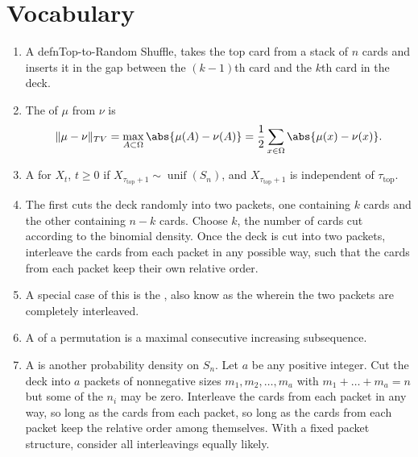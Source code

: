 \documentclass[12pt]{article}
\begin{document}
\section*{Vocabulary}
\begin{enumerate}
    \item
        A defn{Top-to-Random Shuffle},%
        takes the top card from a stack of \( n \) cards and inserts it
        in the gap between the \( (k-1) \)th card and the \( k \)th card
        in the deck.
    \item
        The  of \( \mu \) from \( \nu \)
        is%
        \[
            \| \mu - \nu \|_{TV} = \max_{A \subset \Omega} \abs{ \mu(A)
            - \nu(A)} = \frac{1}{2} \sum\limits_{x \in \Omega} \abs{ \mu
            (x) - \nu(x)}.
        \]
    \item
        A %
        for \( X_t \), \( t \ge 0 \) if \( X_{\tau_{\text{top}}+1} \sim
        \operatorname{unif}
        (S_n) \), and \( X_{\tau_{\text{top}}+1} \) is independent of \(
        \tau_{\text{top}} \).
    \item
        The  first cuts the deck randomly into two
        packets, one containing \( k \) cards and the other containing \(
        n-k \) cards.  Choose \( k \), the number of cards cut according
        to the binomial density. Once the deck is cut into two packets,
        interleave the cards from each packet in any possible way, such
        that the cards from each packet keep their own relative order.
    \item
        A special case of this is the , also know
        as the  wherein the two packets are
        completely interleaved.
    \item
        A  of a permutation is a maximal
        consecutive increasing subsequence.
    \item
        A  is another probability density on \( S_n
        \).  Let \( a \) be any positive integer.  Cut the deck into \(
        a \) packets of nonnegative sizes \( m_1, m_2, \dots, m_a \)
        with \( m_1 + \dots + m_a = n \) but some of the \( n_i \) may
        be zero. Interleave the cards from each packet in any way, so
        long as the cards from each packet, so long as the cards from
        each packet keep the relative order among themselves.  With a
        fixed packet structure, consider all interleavings equally
        likely.
\end{enumerate}
\end{document}
